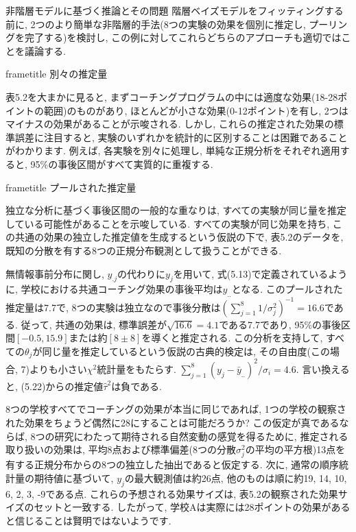 \documentclass[10pt,dvipdfmx,a4]{beamer}
\newcommand{\dbox}[1]{\begin{beamercolorbox}[wd=122mm, sep=0pt, shadow=false, rounded=false]{frametitle} { #1}\end{beamercolorbox}}
\begin{document}

\begin{frame}{非階層モデルに基づく推論とその問題}
階層ベイズモデルをフィッティングする前に, 2つのより簡単な非階層的手法(8つの実験の効果を個別に推定し, プーリングを完了する)を検討し, この例に対してこれらどちらのアプローチも適切ではことを議論する.

\dbox{別々の推定量}
表5.2を大まかに見ると, まずコーチングプログラムの中には適度な効果(18-28ポイントの範囲)のものがあり, ほとんどが小さな効果(0-12ポイント)を有し, 2つはマイナスの効果があることが示唆される.
しかし, これらの推定された効果の標準誤差に注目すると, 実験のいずれかを統計的に区別することは困難であることがわかります.
例えば, 各実験を別々に処理し, 単純な正規分析をそれぞれ適用すると, 95\%の事後区間がすべて実質的に重複する.

\dbox{プールされた推定量}
独立な分析に基づく事後区間の一般的な重なりは, すべての実験が同じ量を推定している可能性があることを示唆している.
すべての実験が同じ効果を持ち, この共通の効果の独立した推定値を生成するという仮説の下で, 表5.2のデータを, 既知の分散を有する8つの正規分布観測として扱うことができる.
\end{frame}


\begin{frame}
無情報事前分布に関し, $y_{.j}$の代わりに$y_j$を用いて, 式(5.13)で定義されているように, 学校における共通コーチング効果の事後平均は$y_{..}$となる.
このプールされた推定量は7.7で, 8つの実験は独立なので事後分散は$(\sum_{j=1}^8 1/\sigma_j^2)^{-1}=16.6$である.
従って, 共通の効果は, 標準誤差が$\sqrt{16.6}=4.1$である7.7であり, 95\%の事後区間$[-0.5,15.9]$または約$[8\pm8]$を導くと推定される.
この分析を支持して, すべての$\theta_j$が同じ量を推定しているという仮説の古典的検定は, その自由度(この場合, 7)よりも小さい$\chi^2$統計量をもたらす.
$\sum_{j=1}^8(y_j-\bar{y}_{..})^2/\sigma_i=4.6$.
言い換えると, (5.22)からの推定値$\hat{\tau}^2$は負である.

8つの学校すべてでコーチングの効果が本当に同じであれば, 1つの学校の観察された効果をちょうど偶然に28にすることは可能だろうか?
この仮定が真であるならば, 8つの研究にわたって期待される自然変動の感覚を得るために, 推定される取り扱いの効果は, 平均8点および標準偏差(8つの分散$\sigma_j^2$の平均の平方根)13点を有する正規分布からの8つの独立した抽出であると仮定する.
次に, 通常の順序統計量の期待値に基づいて, $y_j$の最大観測値は約26点, 他のものは順に約19, 14, 10, 6, 2, 3, -9である点.
これらの予想される効果サイズは, 表5.2の観察された効果サイズのセットと一致する.
したがって, 学校Aは実際には28ポイントの効果があると信じることは賢明ではないようです.
\end{frame}
\end{document}
